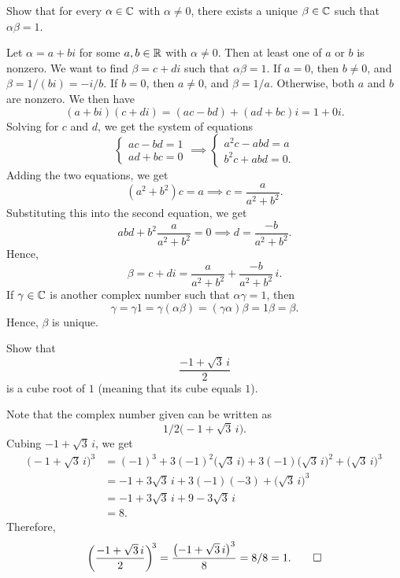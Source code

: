 \begin{exc}
\begin{exercise}
Show that for every $\alpha\in\mathbb{C}$ with $\alpha\ne0$, there exists a unique
$\beta\in\mathbb{C}$ such that $\alpha\beta=1$.
\end{exercise}
\begin{solution}
Let $\alpha=a+bi$ for some $a,b\in\mathbb{R}$ with $\alpha\ne0$. Then at least one of
$a$ or $b$ is nonzero. We want to find $\beta=c+di$ such that $\alpha\beta=1$.
If $a=0$, then $b\ne0$, and $\beta=1/(bi)=-i/b$. If $b=0$, then $a\ne0$, and
$\beta=1/a$. Otherwise, both $a$ and $b$ are nonzero. We then have
\[ (a+bi)(c+di) = (ac-bd)+(ad+bc)i = 1+0i. \]
Solving for $c$ and $d$, we get the system of equations
\[ \begin{cases} ac-bd=1\\ ad+bc=0 \end{cases}
   \implies
   \begin{cases} a^2c-abd=a\\ b^2c+abd=0. \end{cases} \]
Adding the two equations, we get
\[ (a^2+b^2)c=a \implies c=\frac{a}{a^2+b^2}. \]
Substituting this into the second equation, we get
\[ abd+b^2\frac{a}{a^2+b^2}=0 \implies d=\frac{-b}{a^2+b^2}. \]
Hence,
\[ \beta=c+di=\frac{a}{a^2+b^2}+\frac{-b}{a^2+b^2}\,i. \]
If $\gamma\in\mathbb{C}$ is another complex number such that $\alpha\gamma=1$, then
\[ \gamma=\gamma1=\gamma(\alpha\beta)=(\gamma\alpha)\beta=1\beta=\beta. \]
Hence, $\beta$ is unique.
\end{solution}

\begin{exercise}
Show that
\[ \frac{-1+\sqrt3\,i}{2} \]
is a cube root of $1$ (meaning that its cube equals $1$).
\end{exercise}
\begin{solution}
Note that the complex number given can be written as
\[ 1/2\bigl(-1+\sqrt3\,i\bigr). \]
Cubing $-1+\sqrt3\,i$, we get
\begin{align*}
\bigl(-1+\sqrt3\,i\bigr)^3
  &= (-1)^3+3(-1)^2\bigl(\sqrt3\,i\bigr)+3(-1)\bigl(\sqrt3\,i\bigr)^2+\bigl(\sqrt3\,i\bigr)^3\\
  &= -1+3\sqrt3\,i+3(-1)(-3)+\bigl(\sqrt3\,i\bigr)^3\\
  &= -1+3\sqrt3\,i+9-3\sqrt3\,i\\
  &= 8.
\end{align*}
Therefore,
\[ \biggl(\frac{-1+\sqrt3\,i}{2}\biggr)^{\!3}
   = \frac{\bigl(-1+\sqrt3\,i\bigr)^3}{8} = 8/8 = 1. \qedhere \]
\end{solution}


\end{exc}
